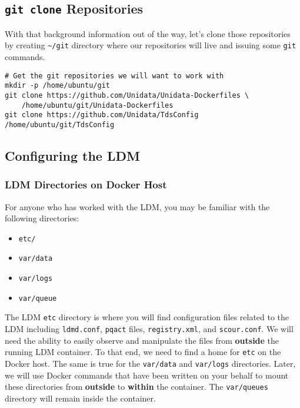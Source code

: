 \documentclass[11pt]{article}
\begin{document}
\subsection{\texttt{git clone} Repositories}
\label{sec:orgheadline15}

With that background information out of the way, let's clone those repositories by creating \texttt{\textasciitilde{}/git} directory where our repositories will live and issuing some \texttt{git} commands.

\begin{verbatim}
# Get the git repositories we will want to work with
mkdir -p /home/ubuntu/git
git clone https://github.com/Unidata/Unidata-Dockerfiles \
    /home/ubuntu/git/Unidata-Dockerfiles
git clone https://github.com/Unidata/TdsConfig /home/ubuntu/git/TdsConfig
\end{verbatim}

\subsection{Configuring the LDM}
\label{sec:orgheadline24}
\subsubsection{LDM Directories on Docker Host}
\label{sec:orgheadline16}

For anyone who has worked with the LDM, you may be familiar with the following directories:


\begin{itemize}
\item \texttt{etc/}
\item \texttt{var/data}
\item \texttt{var/logs}
\item \texttt{var/queue}
\end{itemize}


The LDM \texttt{etc} directory is where you will find configuration files related to the LDM including \texttt{ldmd.conf}, \texttt{pqact} files, \texttt{registry.xml}, and  \texttt{scour.conf}. We will need the ability to easily observe and manipulate the files from \textbf{outside} the running LDM container. To that end, we need to find a home for \texttt{etc} on the Docker host. The same is true for the \texttt{var/data} and \texttt{var/logs} directories. Later, we will use Docker commands that have been written on your behalf to mount these directories from \textbf{outside} to \textbf{within} the container. The \texttt{var/queues} directory will remain inside the container.
\end{document}
